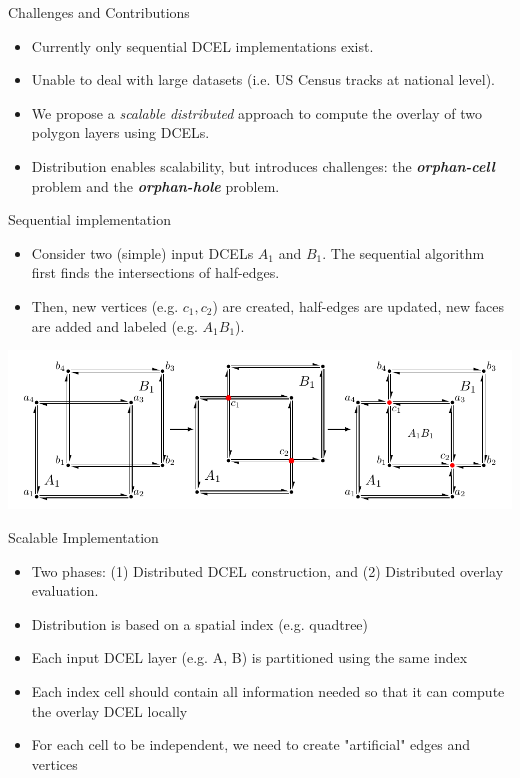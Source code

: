     \begin{frame}{Challenges and Contributions}
        \begin{itemize}
            \item Currently only sequential DCEL implementations exist.
            \item Unable to deal with large datasets (i.e. US Census tracks at national level).
            \item We propose a \textit{scalable} \textit{distributed} approach to compute the overlay of two polygon layers using DCELs.
            \item Distribution enables scalability, but introduces challenges: the \textbf{\textit{orphan-cell}} problem and the \textbf{\textit{orphan-hole}} problem.
        \end{itemize}

    \end{frame}

    \begin{frame}{Sequential implementation}
        \begin{itemize}
                \item Consider two (simple) input DCELs $A_1$ and $B_1$.  The sequential algorithm first finds the intersections of half-edges.
                \item Then, new vertices (e.g. $c_1, c_2$) are created,  half-edges are updated, new faces are added and labeled (e.g. $A_1B_1$).
        \end{itemize}

        \centering
        \includegraphics[width=\textwidth]{../thesis/chapterSDCEL/dcel2}
    \end{frame}

    \begin{frame}{Scalable Implementation}
        \begin{itemize}
            \small
            \item Two phases: (1) Distributed DCEL construction, and (2) Distributed overlay evaluation.
            \item Distribution is based on a spatial index (e.g. quadtree)
            \item Each input DCEL layer (e.g. A, B) is partitioned using the same index
            \item Each index cell should contain all information needed so that it can compute the overlay DCEL locally
            \item For each cell to be independent, we need to create "artificial" edges and vertices
        \end{itemize}
    \end{frame}

